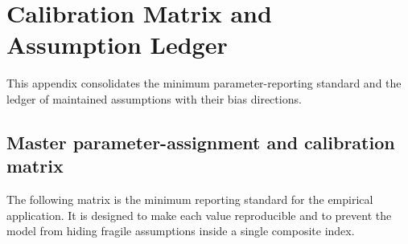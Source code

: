 \documentclass[11pt,a4paper]{article}
\begin{document}
\section{Calibration Matrix and Assumption Ledger}\label{app:calibration_ledger}

This appendix consolidates the minimum parameter-reporting standard and the ledger of maintained assumptions with their bias directions.

\subsection{Master parameter-assignment and calibration matrix}

The following matrix is the minimum reporting standard for the empirical application. It is designed to make each value reproducible and to prevent the model from hiding fragile assumptions inside a single composite index.
\end{document}
